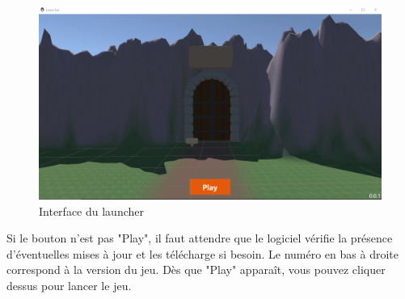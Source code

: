 \documentclass[a4paper, 10pt]{article}
\begin{document}
	\begin{figure}[ht]
		\centering
		\includegraphics[scale=0.4]{images/launcher.png}
		\caption{Interface du launcher}
	\end{figure}

	Si le bouton n'est pas "Play", il faut attendre que le logiciel vérifie la présence d'éventuelles mises à jour et les télécharge si besoin. Le numéro en bas à droite correspond à la version du jeu. Dès que "Play" apparaît, vous pouvez cliquer dessus pour lancer le jeu.
	
\end{document}
